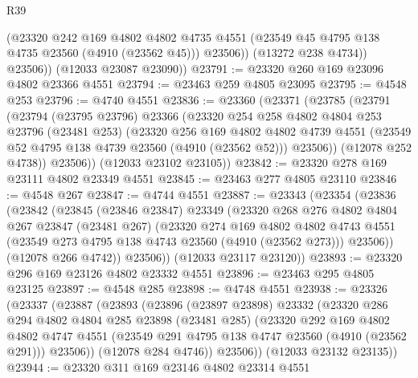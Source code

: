 \begin{lexlean}{R39}
\begin{coremodule}
              (@23320
                @242
                @169
                @4802
                @4802
                @4735
                @4551
                (@23549 @45 @4795 @138 @4735 @23560 (@4910 (@23562 @45)))
                @23506))
            (@13272 @238 @4734))
          @23506))
      (@12033 @23087 @23090))
@23791 := @23320 @260 @169 @23096 @4802 @23366 @4551
@23794 := @23463 @259 @4805 @23095
@23795 := @4548 @253
@23796 := @4740 @4551
@23836 := @23360
    (@23371
      (@23785
        (@23791
          (@23794
            (@23795 @23796)
            @23366
            (@23320
              @254
              @258
              @4802
              @4804
              @253
              @23796
              (@23481 @253)
              (@23320
                @256
                @169
                @4802
                @4802
                @4739
                @4551
                (@23549 @52 @4795 @138 @4739 @23560 (@4910 (@23562 @52)))
                @23506))
            (@12078 @252 @4738))
          @23506))
      (@12033 @23102 @23105))
@23842 := @23320 @278 @169 @23111 @4802 @23349 @4551
@23845 := @23463 @277 @4805 @23110
@23846 := @4548 @267
@23847 := @4744 @4551
@23887 := @23343
    (@23354
      (@23836
        (@23842
          (@23845
            (@23846 @23847)
            @23349
            (@23320
              @268
              @276
              @4802
              @4804
              @267
              @23847
              (@23481 @267)
              (@23320
                @274
                @169
                @4802
                @4802
                @4743
                @4551
                (@23549 @273 @4795 @138 @4743 @23560 (@4910 (@23562 @273)))
                @23506))
            (@12078 @266 @4742))
          @23506))
      (@12033 @23117 @23120))
@23893 := @23320 @296 @169 @23126 @4802 @23332 @4551
@23896 := @23463 @295 @4805 @23125
@23897 := @4548 @285
@23898 := @4748 @4551
@23938 := @23326
    (@23337
      (@23887
        (@23893
          (@23896
            (@23897 @23898)
            @23332
            (@23320
              @286
              @294
              @4802
              @4804
              @285
              @23898
              (@23481 @285)
              (@23320
                @292
                @169
                @4802
                @4802
                @4747
                @4551
                (@23549 @291 @4795 @138 @4747 @23560 (@4910 (@23562 @291)))
                @23506))
            (@12078 @284 @4746))
          @23506))
      (@12033 @23132 @23135))
@23944 := @23320 @311 @169 @23146 @4802 @23314 @4551

\end{coremodule}
\end{lexlean}
